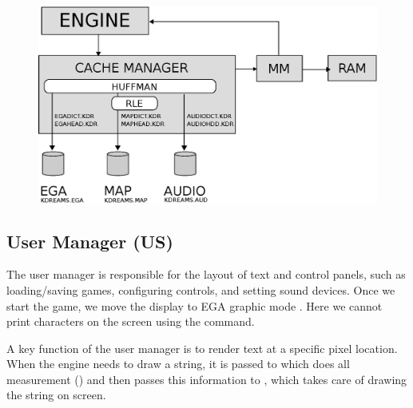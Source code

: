 \documentclass[book.tex]{subfiles}
\begin{document}
 \par
\begin{figure}[H]
\centering
 \includegraphics[width=\textwidth]{imgs/drawings/cache_manager_architecture.eps}
 \end{figure}




 
\subsection{User Manager (US)} 
\label{section:bitshifting}
The user manager is responsible for the layout of text and control panels, such as loading/saving games, configuring controls, and setting sound devices. Once we start the game, we move the display to EGA graphic mode . Here we cannot print characters on the screen using the  command. \\

\par
A key function of the user manager is to render text at a specific pixel location. When the engine needs to draw a string, it is passed to  which does all measurement () and then passes this information to , which takes care of drawing the string on screen.\\
\end{document}

